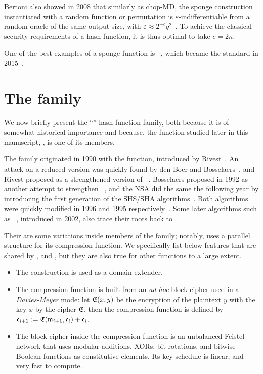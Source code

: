 Bertoni \etal also showed in 2008 that similarly as chop-MD, the sponge construction instantiated with a random function or permutation is $\varepsilon$-indifferentiable from a random oracle
of the same output size, with $\varepsilon \approx 2^{-c}q^2$~\cite{DBLP:conf/eurocrypt/BertoniDPA08}. To achieve the classical security requirements of a hash function, it is thus optimal to take $c = 2n$.

One of the best examples of a sponge function is \keccak~\cite{KeccakReference}, which became the \shathree standard in 2015~\cite{Nist-SHA3}.

\section{The \mdsha family}
\label{sec:mdsha}
We now briefly present the ``\mdsha'' hash function family, both because it is of somewhat historical importance and because, the function studied later in this manuscript, \shaone, is one of its members.

The family originated in 1990 with the \mdfour function, introduced by Rivest~\cite{Rivest-md4}. An attack on a reduced version was quickly found by den Boer and Bosselaers~\cite{DBLP:conf/crypto/BoerB91},
and Rivest proposed \mdfive as a strengthened version of \mdfour~\cite{Rivest-md5}. Bosselaers proposed \ripemd in 1992 as another attempt to strengthen
\mdfour~\cite[Chapter 3]{DBLP:books/sp/BosselaersP95},
and the NSA did the same the following year by introducing the first generation of the SHS/SHA algorithms~\cite{Nist-SHA0}. Both algorithms were quickly modified in 1996 and 1995 respectively~\cite{DBLP:conf/fse/DobbertinBP96,Nist-SHA1}.
Some later algorithms such as \shatwo~\cite{Nist-SHA}, introduced in 2002, also trace their roots back to \mdfour.

Their are some variations inside members of the family; notably, \ripemd uses a parallel structure for its compression function. We specifically list below features that are shared by \mdfour, \mdfive and \sha, but they are also
true for other \mdsha functions to a large extent.
\begin{itemize}
\item The \merkdam construction is used as a domain extender.
\item The compression function is built from an \emph{ad-hoc} block cipher used in a \emph{Davies-Meyer} mode: let $\operatorname{\mathfrak{E}}(x,y)$ be the encryption of the plaintext $y$ with the key $x$ by the cipher $\operatorname{\mathfrak{E}}$, then
the compression function is defined by
$\mathfrak{c}_{i+1} := \operatorname{\mathfrak{E}}(\mathfrak{m}_{i+1},\mathfrak{c}_i) + \mathfrak{c}_i$.
\item The block cipher inside the compression function is an unbalanced Feistel network that uses modular additions, XORs, bit rotations, and bitwise Boolean functions as constitutive elements. Its key schedule is linear, and very fast to compute.
\end{itemize}

